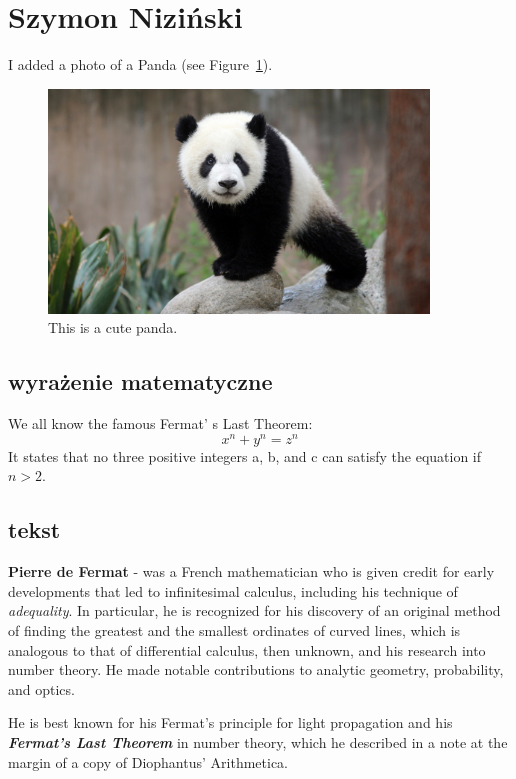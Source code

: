 \section{Szymon Niziński}
\label{sec: nizinskisz}



I added a photo of a Panda (see Figure~\ref{fig:panda1}).

\begin{figure}[h]
    \centering
    \includegraphics[width=0.9\textwidth]{pictures/panda.jpeg}
    \caption{This is a cute panda.}
    \label{fig:panda1}
\end{figure}

\subsection*{wyrażenie matematyczne}
We all know the famous Fermat' s Last Theorem:
\[ x^n + y^n = z^n \]
It states that no three positive integers a, b, and c can satisfy the equation if \( n > 2\).

\subsection*{tekst}

\textbf{Pierre de Fermat} - was a French mathematician who is given credit for early developments that led to infinitesimal calculus, including his technique of \textit{adequality}. In particular, he is recognized for his discovery of an original method of finding the greatest and the smallest ordinates of curved lines, which is analogous to that of differential calculus, then unknown, and his research into number theory. He made notable contributions to analytic geometry, probability, and optics. 

He is best known for his Fermat's principle for light propagation and his \textbf{\emph{Fermat's Last Theorem}} in number theory, which he described in a note at the margin of a copy of Diophantus' Arithmetica.

